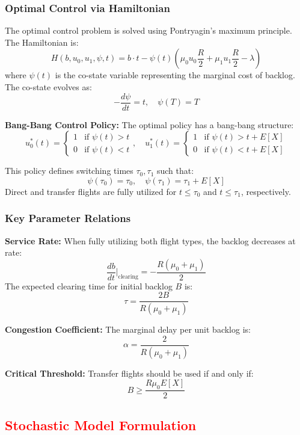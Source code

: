 \documentclass[opre,sglanonrev]{informs4}
\begin{document}
{\subsubsection{Optimal Control via Hamiltonian}

The optimal control problem is solved using Pontryagin's maximum principle. The Hamiltonian is:
\[
H(b, u_0, u_1, \psi, t) = b \cdot t - \psi(t) \left( \mu_0 u_0 \frac{R}{2} + \mu_1 u_1 \frac{R}{2} - \lambda \right)
\]
where \( \psi(t) \) is the co-state variable representing the marginal cost of backlog. The co-state evolves as:
\[
-\frac{d\psi}{dt} = t, \quad \psi(T) = T
\]

\textbf{Bang-Bang Control Policy:} The optimal policy has a bang-bang structure:
\[
u_0^*(t) = \begin{cases} 
1 & \text{if } \psi(t) > t \\
0 & \text{if } \psi(t) < t
\end{cases}, \quad
u_1^*(t) = \begin{cases} 
1 & \text{if } \psi(t) > t + E[X] \\
0 & \text{if } \psi(t) < t + E[X]
\end{cases}
\]

This policy defines switching times \( \tau_0, \tau_1 \) such that:
\[
\psi(\tau_0) = \tau_0, \quad \psi(\tau_1) = \tau_1 + E[X]
\]
Direct and transfer flights are fully utilized for \( t \leq \tau_0 \) and \( t \leq \tau_1 \), respectively.

\subsubsection{Key Parameter Relations}

\textbf{Service Rate:} When fully utilizing both flight types, the backlog decreases at rate:
\[
\frac{db}{dt}\bigg|_{\text{clearing}} = -\frac{R(\mu_0 + \mu_1)}{2}
\]
The expected clearing time for initial backlog \( B \) is:
\[
\tau = \frac{2B}{R(\mu_0 + \mu_1)}
\]

\textbf{Congestion Coefficient:} The marginal delay per unit backlog is:
\[
\alpha = \frac{2}{R(\mu_0 + \mu_1)}
\]

\textbf{Critical Threshold:} Transfer flights should be used if and only if:
\[
B \geq \frac{R\mu_0 E[X]}{2}
\]
}

\subsection{\textcolor{red}{Stochastic Model Formulation}}
\label{sec:stochastic_model_formulation}
\end{document}

